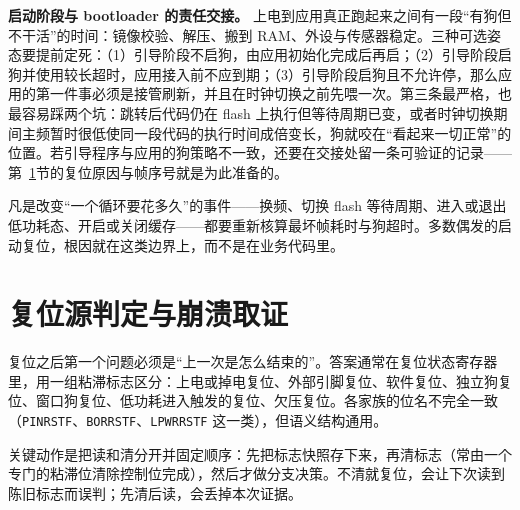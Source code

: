 \documentclass[12pt,a4paper,fontset=fandol]{ctexbook}
\newcommand{\Tp}[1]{\texttt{#1}}
\begin{document}
\textbf{启动阶段与 bootloader 的责任交接。} 上电到应用真正跑起来之间有一段``有狗但不干活''的时间：镜像校验、解压、搬到 RAM、外设与传感器稳定。三种可选姿态要提前定死：（1）引导阶段不启狗，由应用初始化完成后再启；（2）引导阶段启狗并使用较长超时，应用接入前不应到期；（3）引导阶段启狗且不允许停，那么应用的第一件事必须是接管刷新，并且在时钟切换之前先喂一次。第三条最严格，也最容易踩两个坑：跳转后代码仍在 flash 上执行但等待周期已变，或者时钟切换期间主频暂时很低使同一段代码的执行时间成倍变长，狗就咬在``看起来一切正常''的位置。若引导程序与应用的狗策略不一致，还要在交接处留一条可验证的记录——第~\ref{sec:ch04-forensics}节的复位原因与帧序号就是为此准备的。

\begin{guideline}[title={改变时间标度的事件要单独过一遍狗}]
凡是改变``一个循环要花多久''的事件——换频、切换 flash 等待周期、进入或退出低功耗态、开启或关闭缓存——都要重新核算最坏帧耗时与狗超时。多数偶发的启动复位，根因就在这类边界上，而不是在业务代码里。
\end{guideline}

\section{复位源判定与崩溃取证}
\label{sec:ch04-forensics}

复位之后第一个问题必须是``上一次是怎么结束的''。答案通常在复位状态寄存器里，用一组粘滞标志区分：上电或掉电复位、外部引脚复位、软件复位、独立狗复位、窗口狗复位、低功耗进入触发的复位、欠压复位。各家族的位名不完全一致（\Tp{PINRSTF}、\Tp{BORRSTF}、\Tp{LPWRRSTF} 这一类），但语义结构通用。

关键动作是把读和清分开并固定顺序：先把标志快照存下来，再清标志（常由一个专门的粘滞位清除控制位完成），然后才做分支决策。不清就复位，会让下次读到陈旧标志而误判；先清后读，会丢掉本次证据。
\end{document}
